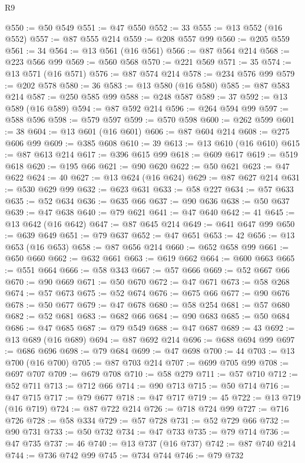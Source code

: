 \begin{lexlean}{R9}
\begin{coremodule}
@550 := @50 @549
@551 := @47 @550
@552 := 33
@555 := @13 @552 (@16 @552)
@557 := @87 @555 @214
@559 := @208 @557 @99
@560 := @205 @559
@561 := 34
@564 := @13 @561 (@16 @561)
@566 := @87 @564 @214
@568 := @223 @566 @99
@569 := @560 @568
@570 := @221 @569
@571 := 35
@574 := @13 @571 (@16 @571)
@576 := @87 @574 @214
@578 := @234 @576 @99
@579 := @202 @578
@580 := 36
@583 := @13 @580 (@16 @580)
@585 := @87 @583 @214
@587 := @250 @585 @99
@588 := @248 @587
@589 := 37
@592 := @13 @589 (@16 @589)
@594 := @87 @592 @214
@596 := @264 @594 @99
@597 := @588 @596
@598 := @579 @597
@599 := @570 @598
@600 := @262 @599
@601 := 38
@604 := @13 @601 (@16 @601)
@606 := @87 @604 @214
@608 := @275 @606 @99
@609 := @385 @608
@610 := 39
@613 := @13 @610 (@16 @610)
@615 := @87 @613 @214
@617 := @396 @615 @99
@618 := @609 @617
@619 := @519 @618
@620 := @195 @66
@621 := @90 @620
@622 := @50 @621
@623 := @47 @622
@624 := 40
@627 := @13 @624 (@16 @624)
@629 := @87 @627 @214
@631 := @530 @629 @99
@632 := @623 @631
@633 := @58 @227
@634 := @57 @633
@635 := @52 @634
@636 := @635 @66
@637 := @90 @636
@638 := @50 @637
@639 := @47 @638
@640 := @79 @621
@641 := @47 @640
@642 := 41
@645 := @13 @642 (@16 @642)
@647 := @87 @645 @214
@649 := @641 @647 @99
@650 := @639 @649
@651 := @79 @637
@652 := @47 @651
@653 := 42
@656 := @13 @653 (@16 @653)
@658 := @87 @656 @214
@660 := @652 @658 @99
@661 := @650 @660
@662 := @632 @661
@663 := @619 @662
@664 := @600 @663
@665 := @551 @664
@666 := @58 @343
@667 := @57 @666
@669 := @52 @667 @66
@670 := @90 @669
@671 := @50 @670
@672 := @47 @671
@673 := @58 @268
@674 := @57 @673
@675 := @52 @674
@676 := @675 @66
@677 := @90 @676
@678 := @50 @677
@679 := @47 @678
@680 := @58 @254
@681 := @57 @680
@682 := @52 @681
@683 := @682 @66
@684 := @90 @683
@685 := @50 @684
@686 := @47 @685
@687 := @79 @549
@688 := @47 @687
@689 := 43
@692 := @13 @689 (@16 @689)
@694 := @87 @692 @214
@696 := @688 @694 @99
@697 := @686 @696
@698 := @79 @684
@699 := @47 @698
@700 := 44
@703 := @13 @700 (@16 @700)
@705 := @87 @703 @214
@707 := @699 @705 @99
@708 := @697 @707
@709 := @679 @708
@710 := @58 @279
@711 := @57 @710
@712 := @52 @711
@713 := @712 @66
@714 := @90 @713
@715 := @50 @714
@716 := @47 @715
@717 := @79 @677
@718 := @47 @717
@719 := 45
@722 := @13 @719 (@16 @719)
@724 := @87 @722 @214
@726 := @718 @724 @99
@727 := @716 @726
@728 := @58 @334
@729 := @57 @728
@731 := @52 @729 @66
@732 := @90 @731
@733 := @50 @732
@734 := @47 @733
@735 := @79 @714
@736 := @47 @735
@737 := 46
@740 := @13 @737 (@16 @737)
@742 := @87 @740 @214
@744 := @736 @742 @99
@745 := @734 @744
@746 := @79 @732

\end{coremodule}
\end{lexlean}
